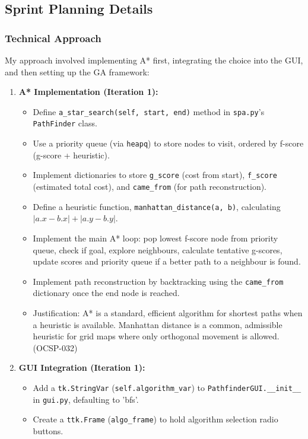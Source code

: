 \clearpage
\subsection{Sprint Planning Details}

\subsubsection{Technical Approach}
My approach involved implementing A* first, integrating the choice into the GUI, and then setting up the GA framework:

\begin{enumerate}
	\item \textbf{A* Implementation (Iteration 1):}
	\begin{itemize}
		\item Define \verb|a_star_search(self, start, end)| method in \verb|spa.py|'s \verb|PathFinder| class.
		\item Use a priority queue (via \verb|heapq|) to store nodes to visit, ordered by f-score (g-score + heuristic).
		\item Implement dictionaries to store \verb|g_score| (cost from start), \verb|f_score| (estimated total cost), and \verb|came_from| (for path reconstruction).
		\item Define a heuristic function, \verb|manhattan_distance(a, b)|, calculating $|a.x - b.x| + |a.y - b.y|$.
		\item Implement the main A* loop: pop lowest f-score node from priority queue, check if goal, explore neighbours, calculate tentative g-scores, update scores and priority queue if a better path to a neighbour is found.
		\item Implement path reconstruction by backtracking using the \verb|came_from| dictionary once the end node is reached.
		\item Justification: A* is a standard, efficient algorithm for shortest paths when a heuristic is available. Manhattan distance is a common, admissible heuristic for grid maps where only orthogonal movement is allowed. (OCSP-032)
	\end{itemize}
	\item \textbf{GUI Integration (Iteration 1):}
	\begin{itemize}
		\item Add a \verb|tk.StringVar| (\verb|self.algorithm_var|) to \verb|PathfinderGUI.__init__| in \verb|gui.py|, defaulting to 'bfs'.
		\item Create a \verb|ttk.Frame| (\verb|algo_frame|) to hold algorithm selection radio buttons.

\end{itemize}
\end{enumerate}
